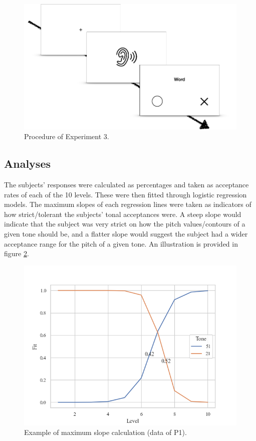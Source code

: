 \documentclass[12pt]{report}
\begin{document}
\begin{CJK}{UTF8}{bsmi}
\begin{figure}[h]
\centering
\includegraphics[scale=1]{Figures/E3/Procedure.png}
\caption{Procedure of Experiment 3.}
\label{Figure:Experiment3Procedure}
\end{figure}

\subsection{Analyses}
The subjects' responses were calculated as percentages and taken as acceptance rates of each of the 10 levels. These were then fitted through logistic regression models. The maximum slopes of each regression lines were taken as indicators of how strict/tolerant the subjects' tonal acceptances were. A steep slope would indicate that the subject was very strict on how the pitch values/contours of a given tone should be, and a flatter slope would suggest the subject had a wider acceptance range for the pitch of a given tone. An illustration is provided in figure \ref{Figure:E3ProcessedExample}.

\begin{figure}[h]
\centering
\includegraphics[scale=1]{Figures/E3/ProcessedExample.png}
\caption{Example of maximum slope calculation (data of P1).}
\label{Figure:E3ProcessedExample}
\end{figure}


\end{CJK}
\end{document}
